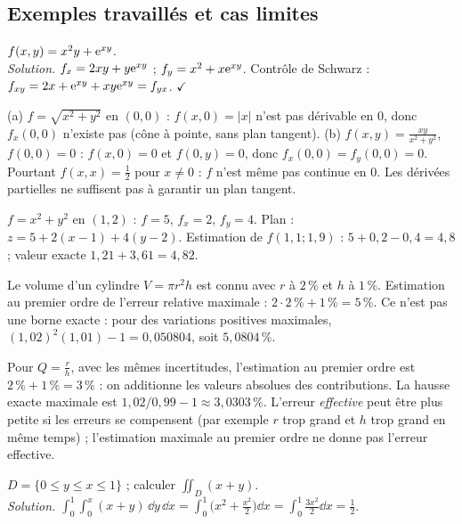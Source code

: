 \subsection{Exemples travaillés et cas limites}
\begin{exemple}
$f(x,y)=x^2y+\mathrm{e}^{xy}$.\\
\emph{Solution.} $f_x=2xy+y\mathrm{e}^{xy}$ ; $f_y=x^2+x\mathrm{e}^{xy}$. Contrôle de Schwarz : $f_{xy}=2x+\mathrm{e}^{xy}+xy\mathrm{e}^{xy}=f_{yx}$. $\checkmark$
\end{exemple}
\begin{cas}
(a) $f=\sqrt{x^2+y^2}$ en $(0,0)$ : $f(x,0)=|x|$ n'est pas dérivable en $0$, donc $f_x(0,0)$ n'existe pas (cône à pointe, sans plan tangent). (b) $f(x,y)=\frac{xy}{x^2+y^2}$, $f(0,0)=0$ : $f(x,0)=0$ et $f(0,y)=0$, donc $f_x(0,0)=f_y(0,0)=0$. Pourtant $f(x,x)=\frac12$ pour $x\ne0$ : $f$ n'est même pas continue en $0$. Les dérivées partielles ne suffisent pas à garantir un plan tangent.
\end{cas}
\begin{exemple}
$f=x^2+y^2$ en $(1,2)$ : $f=5$, $f_x=2$, $f_y=4$. Plan : $z=5+2(x-1)+4(y-2)$. Estimation de $f(1{,}1;1{,}9)$ : $5+0{,}2-0{,}4=4{,}8$ ; valeur exacte $1{,}21+3{,}61=4{,}82$.
\end{exemple}
\begin{exemple}
Le volume d'un cylindre $V=\pi r^2h$ est connu avec $r$ à $2\,\%$ et $h$ à $1\,\%$. Estimation au premier ordre de l'erreur relative maximale : $2\cdot2\,\%+1\,\%=5\,\%$. Ce n'est pas une borne exacte : pour des variations positives maximales, $(1{,}02)^2(1{,}01)-1=0{,}050804$, soit $5{,}0804\,\%$.
\end{exemple}
\begin{cas}
Pour $Q=\frac rh$, avec les mêmes incertitudes, l'estimation au premier ordre est $2\,\%+1\,\%=3\,\%$ : on additionne les valeurs absolues des contributions. La hausse exacte maximale est $1{,}02/0{,}99-1\approx3{,}0303\,\%$. L'erreur \emph{effective} peut être plus petite si les erreurs se compensent (par exemple $r$ trop grand et $h$ trop grand en même temps) ; l'estimation maximale au premier ordre ne donne pas l'erreur effective.
\end{cas}
\begin{exemple}
$D=\{0\le y\le x\le1\}$ ; calculer $\iint_D(x+y)$.\\
\emph{Solution.} $\int_0^1\int_0^x(x+y)\,\dd y\,\dd x=\int_0^1\big(x^2+\frac{x^2}2\big)\dd x=\int_0^1\frac{3x^2}2\dd x=\frac12$.
\end{exemple}
